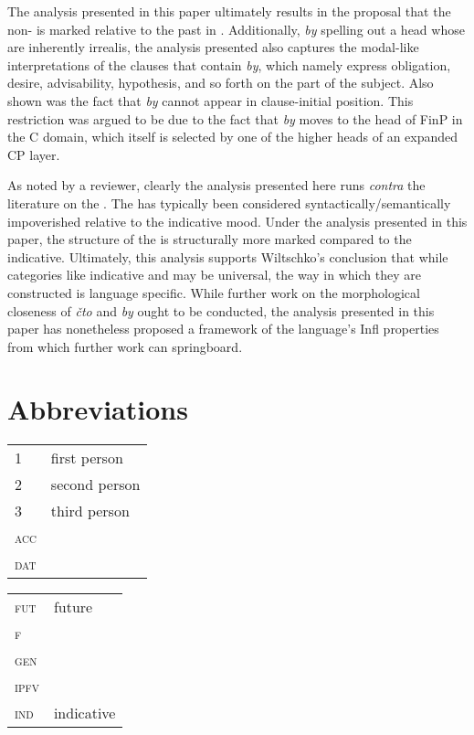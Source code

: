 \documentclass[output=paper,modfonts,newtxmath,hidelinks,]{langscibook}
\begin{document}
The analysis presented in this paper ultimately results in the proposal that the non- is marked relative to the past in . Additionally, \textit{by} spelling out a head whose  are inherently irrealis, the analysis presented also captures the modal-like interpretations of the  clauses that contain \textit{by}, which namely express obligation, desire, advisability, hypothesis, and so forth on the part of the subject. Also shown was the fact that \textit{by} cannot appear in clause-initial position. This restriction was argued to be due to the fact that \textit{by} moves to the head of FinP in the C domain, which itself is selected by one of the higher heads of an expanded CP layer. 

As noted by a reviewer, clearly the analysis presented here runs \textit{contra} the literature on the . The  has typically been considered syntactically/semantically impoverished relative to the indicative mood. Under the analysis presented in this paper, the structure of the   is structurally more marked compared to the indicative. Ultimately, this analysis supports Wiltschko’s conclusion that while categories like indicative and  may be universal, the way in which they are constructed is language specific. While further work on the morphological closeness of \textit{čto} and \textit{by} ought to be conducted, the analysis presented in this paper has nonetheless proposed a framework of the language’s Infl properties from which further work can springboard.




\section*{Abbreviations}


\begin{tabularx}{.5\textwidth}{@{}lQ@{}}
\textsc{1}&first person\\
\textsc{2}&second person\\
\textsc{3}&third person\\
\textsc{acc}&\\
\textsc{dat}&\\
\end{tabularx}%
\begin{tabularx}{.5\textwidth}{@{}lQ@{}}
\textsc{fut}&future\\
\textsc{f}&\\
\textsc{gen}&\\
\textsc{ipfv}&\\
\textsc{ind}&indicative\\
\end{tabularx}%
\end{document}
